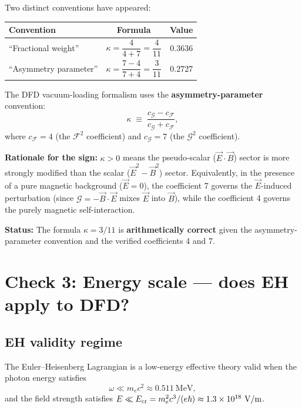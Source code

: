 \documentclass[12pt]{article}
\newcommand{\vE}{\vec{E}}
\newcommand{\vB}{\vec{B}}
\begin{document}
Two distinct conventions have appeared:

\begin{center}
\begin{tabular}{lcc}
\toprule
\textbf{Convention} & \textbf{Formula} & \textbf{Value} \\
\midrule
``Fractional weight'' & $\kappa = \dfrac{4}{4+7} = \dfrac{4}{11}$ & $0.3636$ \\[8pt]
``Asymmetry parameter'' & $\kappa = \dfrac{7 - 4}{7 + 4} = \dfrac{3}{11}$ & $0.2727$ \\
\bottomrule
\end{tabular}
\end{center}

The DFD vacuum-loading formalism uses the \textbf{asymmetry-parameter}
convention:
\begin{equation}
\kappa \;\equiv\; \frac{c_{\mathcal{G}} - c_{\mathcal{F}}}
                      {c_{\mathcal{G}} + c_{\mathcal{F}}},
\end{equation}
where $c_{\mathcal{F}} = 4$ (the $\mathcal{F}^2$ coefficient) and
$c_{\mathcal{G}} = 7$ (the $\mathcal{G}^2$ coefficient).

\textbf{Rationale for the sign:}  $\kappa > 0$ means the
pseudo-scalar ($\vE\cdot\vB$) sector is more strongly modified than
the scalar ($\vE^2 - \vB^2$) sector.  Equivalently, in the presence
of a pure magnetic background ($\vE = 0$), the coefficient 7
governs the $\vE$-induced perturbation (since $\mathcal{G} =
-\vB\cdot\vE$ mixes $\vE$ into $\vB$), while the coefficient 4
governs the purely magnetic self-interaction.

\textbf{Status:} The formula $\kappa = 3/11$ is \textbf{arithmetically
correct} given the asymmetry-parameter convention and the verified
coefficients 4 and 7.

\section{Check 3: Energy scale --- does EH apply to DFD?}

\subsection{EH validity regime}

The Euler--Heisenberg Lagrangian is a low-energy effective theory
valid when the photon energy satisfies
\begin{equation}
\omega \ll m_e c^2 \approx 0.511~\text{MeV},
\end{equation}
and the field strength satisfies $E \ll E_{\rm cr} = m_e^2 c^3 /
(e\hbar) \approx 1.3 \times 10^{18}~\text{V/m}$.
\end{document}
